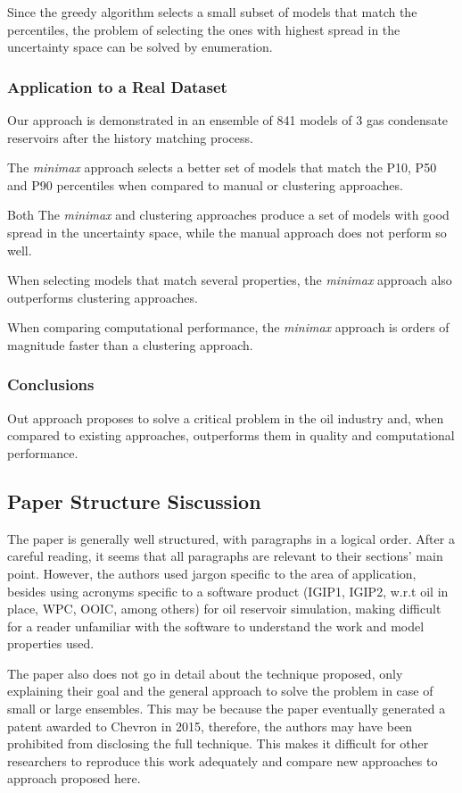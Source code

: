 \documentclass[]{report}
\begin{document}
Since the greedy algorithm selects a small subset of models that match the percentiles, the problem of selecting the ones with highest spread in the uncertainty space can be solved by enumeration.

\subsubsection{Application to a Real Dataset}
Our approach is demonstrated in an ensemble of 841 models of 3 gas condensate reservoirs after the history matching process.

The \textit{minimax} approach selects a better set of models that match the P10, P50 and P90 percentiles when compared to manual or clustering approaches.

Both The \textit{minimax} and clustering approaches produce a set of models with good spread in the uncertainty space, while the manual approach does not perform so well.

When selecting models that match several properties, the \textit{minimax} approach also outperforms clustering approaches.

When comparing computational performance, the \textit{minimax} approach is orders of magnitude faster than a clustering approach.

\subsubsection{Conclusions}
Out approach proposes to solve a critical problem in the oil industry and, when compared to existing approaches, outperforms them in quality and computational performance.

\subsection{Paper Structure Siscussion}
The paper is generally well structured, with paragraphs in a logical order. After a careful reading, it seems that all paragraphs are relevant to their sections' main point. However, the authors used jargon specific to the area of application, besides using acronyms specific to a software product (IGIP1, IGIP2, w.r.t oil in place, WPC, OOIC, among others) for oil reservoir simulation, making difficult for a reader unfamiliar with the software to understand the work and model properties used.

The paper also does not go in detail about the technique proposed, only explaining their goal and the general approach to solve the problem in case of small or large ensembles. This may be because the paper eventually generated a patent awarded to Chevron in 2015, therefore, the authors may have been prohibited from disclosing the full technique. This makes it difficult for other researchers to reproduce this work adequately and compare new approaches to approach proposed here.
\end{document}

